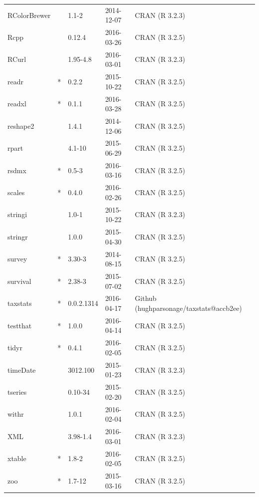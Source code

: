 \begin{subappendices}
\begin{longtable}{lllll}
  RColorBrewer &  & 1.1-2 & 2014-12-07 & CRAN (R 3.2.3) \\ 
  Rcpp &  & 0.12.4 & 2016-03-26 & CRAN (R 3.2.5) \\ 
  RCurl &  & 1.95-4.8 & 2016-03-01 & CRAN (R 3.2.3) \\ 
  readr & * & 0.2.2 & 2015-10-22 & CRAN (R 3.2.5) \\ 
  readxl & * & 0.1.1 & 2016-03-28 & CRAN (R 3.2.5) \\ 
  reshape2 &  & 1.4.1 & 2014-12-06 & CRAN (R 3.2.5) \\ 
  rpart &  & 4.1-10 & 2015-06-29 & CRAN (R 3.2.5) \\ 
  rsdmx & * & 0.5-3 & 2016-03-16 & CRAN (R 3.2.5) \\ 
  scales & * & 0.4.0 & 2016-02-26 & CRAN (R 3.2.5) \\ 
  stringi &  & 1.0-1 & 2015-10-22 & CRAN (R 3.2.3) \\ 
  stringr &  & 1.0.0 & 2015-04-30 & CRAN (R 3.2.5) \\ 
  survey & * & 3.30-3 & 2014-08-15 & CRAN (R 3.2.5) \\ 
  survival & * & 2.38-3 & 2015-07-02 & CRAN (R 3.2.5) \\ 
  taxstats & * & 0.0.2.1314 & 2016-04-17 & Github (hughparsonage/taxstats@accb2ee) \\ 
  testthat & * & 1.0.0 & 2016-04-14 & CRAN (R 3.2.5) \\ 
  tidyr & * & 0.4.1 & 2016-02-05 & CRAN (R 3.2.5) \\ 
  timeDate &  & 3012.100 & 2015-01-23 & CRAN (R 3.2.3) \\ 
  tseries &  & 0.10-34 & 2015-02-20 & CRAN (R 3.2.5) \\ 
  withr &  & 1.0.1 & 2016-02-04 & CRAN (R 3.2.5) \\ 
  XML &  & 3.98-1.4 & 2016-03-01 & CRAN (R 3.2.3) \\ 
  xtable & * & 1.8-2 & 2016-02-05 & CRAN (R 3.2.5) \\ 
  zoo & * & 1.7-12 & 2015-03-16 & CRAN (R 3.2.5) \\ 
   \bottomrule
\end{longtable}
\normalsize

\end{subappendices}






